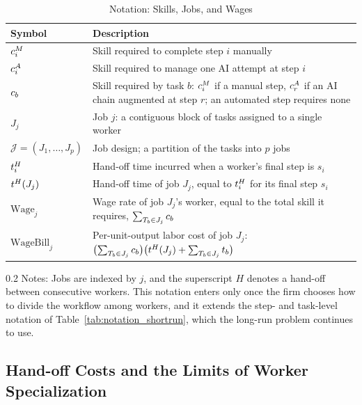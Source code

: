 \begin{table}[!t]
\centering
\caption{Notation: Skills, Jobs, and Wages}
\label{tab:notation_longrun}
    \footnotesize
\begin{tabularx}{\textwidth}{l X}
\toprule
\textbf{Symbol} & \textbf{Description} \\
\midrule
\addlinespace
$c^{M}_{i}$ & Skill required to complete step $i$ manually \\
$c^{A}_{i}$ & Skill required to manage one AI attempt at step $i$ \\
$c_{b}$ & Skill required by task $b$: $c^{M}_{i}$ if a manual step, $c^{A}_{r}$ if an AI chain augmented at step $r$; an automated step requires none \\
\addlinespace
$J_j$ & Job $j$: a contiguous block of tasks assigned to a single worker \\
$\mathcal{J} = (J_1, \dotsc, J_p)$ & Job design; a partition of the tasks into $p$ jobs \\
\addlinespace
$t^{H}_{i}$ & Hand-off time incurred when a worker's final step is $s_i$ \\
$t^{H}_{}(J_j)$ & Hand-off time of job $J_j$, equal to $t^{H}_{i}$ for its final step $s_i$ \\
\addlinespace
$\text{Wage}_j$ & Wage rate of job $J_j$'s worker, equal to the total skill it requires, $\sum_{T_b \in J_j} c_{b}$ \\
$\text{WageBill}_j$ & Per-unit-output labor cost of job $J_j$: $\bigl(\sum_{T_b \in J_j} c_{b}\bigr)\bigl(t^{H}_{}(J_j) + \sum_{T_b \in J_j} t_{b}\bigr)$ \\
\bottomrule
\end{tabularx}

    \begin{minipage}{1\linewidth}
\begin{spacing}{0.2}
{\fontsize{9.5pt}{10pt}\selectfont Notes: Jobs are indexed by $j$, and the superscript $H$ denotes a hand-off between consecutive workers.
This notation enters only once the firm chooses how to divide the workflow among workers, and it extends the step- and task-level notation of Table~\ref{tab:notation_shortrun}, which the long-run problem continues to use.}
\end{spacing}
\end{minipage}
\end{table}


\subsection{Hand-off Costs and the Limits of Worker Specialization}
\label{sec:longrun.specialization}

